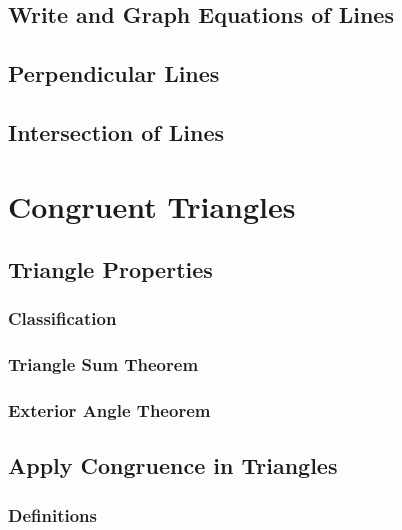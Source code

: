 \documentclass[]{book}
\begin{document}
\section{Write and Graph Equations of
Lines}\label{write-and-graph-equations-of-lines}

\section{Perpendicular Lines}\label{perpendicular-lines}

\section{Intersection of Lines}\label{intersection-of-lines}

\chapter{Congruent Triangles}\label{congruent-triangles}

\section{Triangle Properties}\label{triangle-properties}

\subsection{Classification}\label{classification}

\subsection{Triangle Sum Theorem}\label{triangle-sum-theorem}

\subsection{Exterior Angle Theorem}\label{exterior-angle-theorem}

\section{Apply Congruence in
Triangles}\label{apply-congruence-in-triangles}

\subsection{Definitions}\label{definitions}
\end{document}
